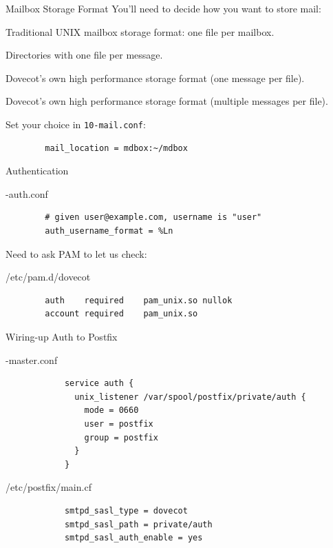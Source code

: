 \documentclass{lug}
\begin{document}
\begin{frame}[fragile]{Mailbox Storage Format}
    You'll need to decide how you want to store mail:
    \begin{description}[<+->]
        \item[\texttt{mbox}] Traditional UNIX mailbox storage format: one file
            per mailbox.
        \item[\texttt{maildir}] Directories with one file per message.
        \item[\texttt{sdbox}] Dovecot's own high performance storage format
            (one message per file).
        \item[\texttt{mdbox}] Dovecot's own high performance storage format
            (multiple messages per file).
    \end{description}

    \pause[\thebeamerpauses]
    Set your choice in \texttt{10-mail.conf}:
    \begin{verbatim}
        mail_location = mdbox:~/mdbox
    \end{verbatim}
\end{frame}

\begin{frame}[fragile]{Authentication}
    \begin{block}{-auth.conf}
    \begin{verbatim}
        # given user@example.com, username is "user"
        auth_username_format = %Ln
    \end{verbatim}
    \end{block}
    \pause
    \medskip

    Need to ask PAM to let us check:
    \begin{block}{\ttfamily /etc/pam.d/dovecot}
    \begin{verbatim}
        auth    required    pam_unix.so nullok
        account required    pam_unix.so
    \end{verbatim}
    \end{block}
\end{frame}

\begin{frame}[fragile]{Wiring-up Auth to Postfix}
    \begin{block}{-master.conf}
        \begin{verbatim}
            service auth {
              unix_listener /var/spool/postfix/private/auth {
                mode = 0660
                user = postfix
                group = postfix
              }
            }
        \end{verbatim}
    \end{block}
    \begin{block}{\ttfamily /etc/postfix/main.cf}
        \begin{verbatim}
            smtpd_sasl_type = dovecot
            smtpd_sasl_path = private/auth
            smtpd_sasl_auth_enable = yes
        \end{verbatim}
    \end{block}
\end{frame}
\end{document}
